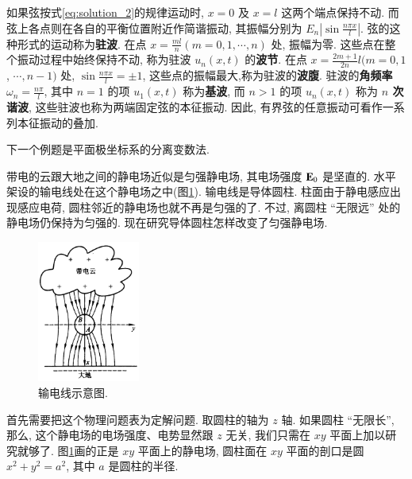 \begin{enumerate}
        如果弦按式\eqref{eq:solution_2}的规律运动时, 
        $x=0$ 及 $x=l$ 这两个端点保持不动. 
        而弦上各点则在各自的平衡位置附近作简谐振动, 
        其振幅分别为 $E_{n}\left|\sin \frac{n \pi x}{l}\right|$. 
        弦的这种形式的运动称为\textbf{驻波}. 
        在点 $x=\frac{m l}{n}(m=0,1, \cdots, n)$ 处, 振幅为零. 
        这些点在整个振动过程中始终保持不动, 称为驻波 $u_{n}(x, t)$ 的\textbf{波节}. 
        在点 $x=\frac{2 m+1}{2 n} l(m=0,1$, $\cdots, n-1)$ 处, 
        $\sin \frac{n \pi x}{l}= \pm 1$, 这些点的振幅最大,称为驻波的\textbf{波腹}.
         驻波的\textbf{角频率} $\omega_{n}=\frac{n \pi}{l}$, 
         其中 $n=1$ 的项 $u_{1}(x, t)$ 称为\textbf{基波}, 
         而 $n>1$ 的项 $u_{n}(x, t)$ 称为 \textbf{$n$ 次谐波}, 
         这些驻波也称为两端固定弦的本征振动. 
         因此, 有界弦的任意振动可看作一系列本征振动的叠加.
        
\end{enumerate}



\setlength\intextsep{5pt}
下一个例题是平面极坐标系的分离变数法.

带电的云跟大地之间的静电场近似是匀强静电场, 其电场强度 ${\mathbf{E}}_{0}$
是坚直的. 水平架设的输电线处在这个静电场之中(图\ref{fig:wire}). 
输电线是导体圆柱. 柱面由于静电感应出现感应电荷, 圆柱邻近的静电场也就不再是匀强的了. 
不过, 离圆柱 “无限远” 处的静电场仍保持为匀强的. 
现在研究导体圆柱怎样改变了匀强静电场.
\begin{figure}
    \begin{center}
        \includegraphics[width=0.3\textwidth]{wire.jpg}
    \end{center}
    \vspace{-20pt}
    \caption{输电线示意图.}
    \vspace{-10pt}
    \label{fig:wire}
  \end{figure}
首先需要把这个物理问题表为定解问题. 取圆柱的轴为 $z$ 轴. 
如果圆柱 “无限长”, 那么, 这个静电场的电场强度、电势显然跟 $z$ 无关, 我们只需在 $x y$ 平面上加以研究就够了.
图\ref{fig:wire}画的正是 $xy$ 平面上的静电场, 圆柱面在
$xy$ 平面的剖口是圆 $x^{2}+y^{2}=a^{2}$, 其中 $a$ 是圆柱的半径.

